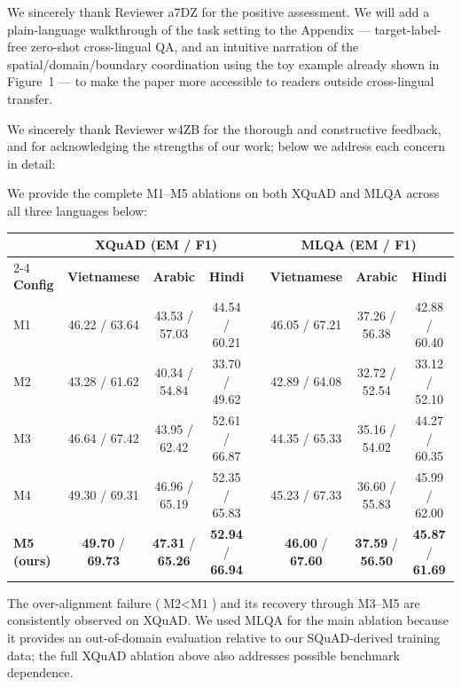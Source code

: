 
We sincerely thank Reviewer a7DZ for the positive assessment. We will add a plain-language walkthrough of the task setting to the Appendix --- target-label-free zero-shot cross-lingual QA, and an intuitive narration of the spatial/domain/boundary coordination using the toy example already shown in Figure~1 --- to make the paper more accessible to readers outside cross-lingual transfer.


We sincerely thank Reviewer w4ZB for the thorough and constructive feedback, and for acknowledging the strengths of our work; below we address each concern in detail:

We provide the complete M1--M5 ablations on both XQuAD and MLQA across all three languages below:

\vspace{0.4em}
\noindent
\begin{center}
\small
\setlength{\tabcolsep}{4.5pt}
\begin{tabular}{l ccc c ccc}
\toprule
& \multicolumn{3}{c}{\textbf{XQuAD} (EM / F1)} & & \multicolumn{3}{c}{\textbf{MLQA} (EM / F1)} \\
\cmidrule{2-4} \cmidrule{6-8}
\textbf{Config} & \textbf{Vietnamese} & \textbf{Arabic} & \textbf{Hindi} & & \textbf{Vietnamese} & \textbf{Arabic} & \textbf{Hindi} \\
\midrule
M1 & 46.22 / 63.64 & 43.53 / 57.03 & 44.54 / 60.21 & & 46.05 / 67.21 & 37.26 / 56.38 & 42.88 / 60.40 \\
M2 & 43.28 / 61.62 & 40.34 / 54.84 & 33.70 / 49.62 & & 42.89 / 64.08 & 32.72 / 52.54 & 33.12 / 52.10 \\
M3 & 46.64 / 67.42 & 43.95 / 62.42 & 52.61 / 66.87 & & 44.35 / 65.33 & 35.16 / 54.02 & 44.27 / 60.35 \\
M4 & 49.30 / 69.31 & 46.96 / 65.19 & 52.35 / 65.83 & & 45.23 / 67.33 & 36.60 / 55.83 & 45.99 / 62.00 \\
\textbf{M5 (ours)} & \textbf{49.70} / \textbf{69.73} & \textbf{47.31} / \textbf{65.26} & \textbf{52.94} / \textbf{66.94} & & \textbf{46.00} / \textbf{67.60} & \textbf{37.59} / \textbf{56.50} & \textbf{45.87} / \textbf{61.69} \\
\bottomrule
\end{tabular}
\end{center}
\vspace{0.4em}

The over-alignment failure ($\text{M2} < \text{M1}$) and its recovery through M3--M5 are consistently observed on XQuAD. We used MLQA for the main ablation because it provides an out-of-domain evaluation relative to our SQuAD-derived training data; the full XQuAD ablation above also addresses possible benchmark dependence.

